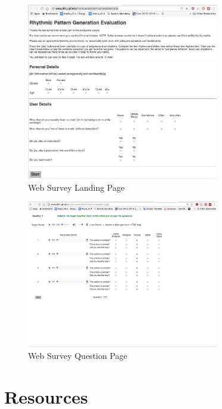 \begin{figure}
	\begin{center}
		\includegraphics[width=0.75\textwidth]{ch99/figures/survey_landing.png}
	\end{center}
	\caption[Web Survey Landing Page]{Web Survey Landing Page}
	\label{fig:survey_landing}
\end{figure}

\begin{figure}
	\begin{center}
		\includegraphics[width=0.75\textwidth]{ch99/figures/survey_page.png}
	\end{center}
	\caption[Web Survey Question Page]{Web Survey Question Page}
	\label{fig:survey_page}
\end{figure}

\chapter{Resources}\label{app:resources}

